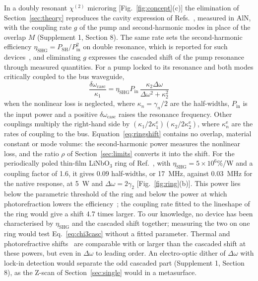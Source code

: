 \documentclass{optica-article}
\newcommand{\chitwo}{\chi^{(2)}}
\newcommand{\Dom}{\Delta\omega}
\begin{document}
In a doubly resonant $\chitwo$ microring [Fig.~\ref{fig:concept}(c)] the
elimination of Section~\ref{sec:theory} reproduces the cavity expression of
Refs.~\cite{cui2022,cui2025}, measured in AlN, with the coupling rate $g$
of the pump and second-harmonic modes in place of the overlap $M$
(Supplement 1, Section 8).  The same rate sets the second-harmonic
efficiency $\eta_{\mathrm{SHG}}=P_{\mathrm{SH}}/P_{\mathrm{in}}^2$ on double
resonance, which is reported for such devices~\cite{lu2019,lu2020,zhao2022}, and
eliminating $g$ expresses the cascaded shift of the pump resonance through
measured quantities.  For a pump locked to its resonance and both modes
critically coupled to the bus waveguide,
\begin{equation}
  \frac{\delta\omega_{\mathrm{casc}}}{\kappa_1}
  =\eta_{\mathrm{SHG}}P_{\mathrm{in}}\,\frac{\kappa_2\Dom}{\Dom^2+\kappa_2^2}
  \label{eq:ringshift}
\end{equation}
when the nonlinear loss is neglected, where $\kappa_n=\gamma_n/2$ are the
half-widths, $P_{\mathrm{in}}$ is the input power and a positive
$\delta\omega_{\mathrm{casc}}$ raises the resonance frequency.  Other
couplings multiply the right-hand side by
$(\kappa_1/2\kappa_1^{\mathrm e})(\kappa_2/2\kappa_2^{\mathrm e})$, where
$\kappa_n^{\mathrm e}$ are the rates of coupling to the bus.
Equation~\eqref{eq:ringshift} contains no overlap, material constant or
mode volume: the second-harmonic power measures the nonlinear loss, and the
ratio $\rho$ of Section~\ref{sec:limits} converts it into the shift.  For
the periodically poled thin-film LiNbO$_3$ ring of Ref.~\cite{lu2020}, with
$\eta_{\mathrm{SHG}}=5\times10^6$\%/W and a coupling factor of 1.6, it
gives 0.09 half-widths, or
17~MHz, against 0.03~MHz for the native response, at 5~\textmu W and
$\Dom=2\gamma_2$ [Fig.~\ref{fig:ring}(b)].  This power lies below the
parametric threshold of the ring and below the power at which
photorefraction lowers the efficiency~\cite{lu2020}; the coupling rate
fitted to the lineshape of the ring would give a shift 4.7 times larger.
To our knowledge, no device has been characterised by
$\eta_{\mathrm{SHG}}$ and the cascaded shift together; measuring the two on
one ring would test Eq.~\eqref{eq:chi3casc} without a fitted parameter.
Thermal and photorefractive shifts~\cite{sun2017,xu2021} are comparable
with or larger than the cascaded shift at these powers, but even in $\Dom$
to leading order.  An electro-optic dither of $\Dom$ with lock-in detection
would separate the odd cascaded part (Supplement 1, Section 8), as the
Z-scan of Section~\ref{sec:single} would in a metasurface.
\end{document}
